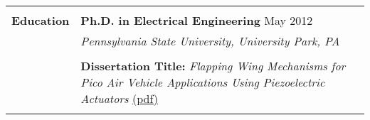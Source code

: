 \begin{tabular}{L{\hlcolw}  L{\rcolw}}
    \\ 
    \hline  
    \hline   
    \\
\textbf{\Large Education} & \textbf{\large Ph.D. in Electrical Engineering} \hfill {\large May 2012} 
\vspace{0.05in} \\ 
& {\it\large Pennsylvania State University, University Park, PA} \\ \\
&  \textbf{Dissertation Title:} \textit{Flapping Wing Mechanisms for Pico Air Vehicle Applications Using Piezoelectric Actuators}
\href{http://www.mne.psu.edu/mrl/theses/mateti.pdf}{(pdf)} 
\\
\\
 
\end{tabular}